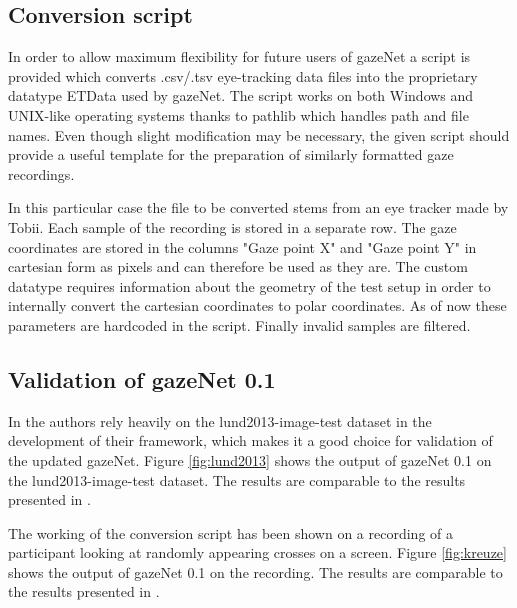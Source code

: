 \documentclass[conference]{IEEEtran}
\begin{document}
\subsection{Conversion script}
In order to allow maximum flexibility for future users of gazeNet a script is provided which converts .csv/.tsv eye-tracking data files into the proprietary datatype ETData used by gazeNet. The script works on both Windows and UNIX-like operating systems thanks to pathlib which handles path and file names. Even though slight modification may be necessary, the given script should provide a useful template for the preparation of similarly formatted gaze recordings.

In this particular case the file to be converted stems from an eye tracker made by Tobii. Each sample of the recording is stored in a separate row. The gaze coordinates are stored in the columns "Gaze point X" and "Gaze point Y" in cartesian form as pixels and can therefore be used as they are. The custom datatype requires information about the geometry of the test setup in order to internally convert the cartesian coordinates to polar coordinates. As of now these parameters are hardcoded in the script. Finally invalid samples are filtered.

\subsection{Validation of gazeNet 0.1}
In \cite{zemblys2018gazeNet} the authors rely heavily on the lund2013-image-test dataset in the development of their framework, which makes it a good choice for validation of the updated gazeNet. Figure \ref{fig:lund2013} shows the output of gazeNet 0.1 on the lund2013-image-test dataset. The results are comparable to the results presented in \cite{zemblys2018gazeNet}. 

The working of the conversion script has been shown on a recording of a participant looking at randomly appearing crosses on a screen. Figure \ref{fig:kreuze} shows the output of gazeNet 0.1 on the recording. The results are comparable to the results presented in \cite{zemblys2018gazeNet}.
\end{document}
